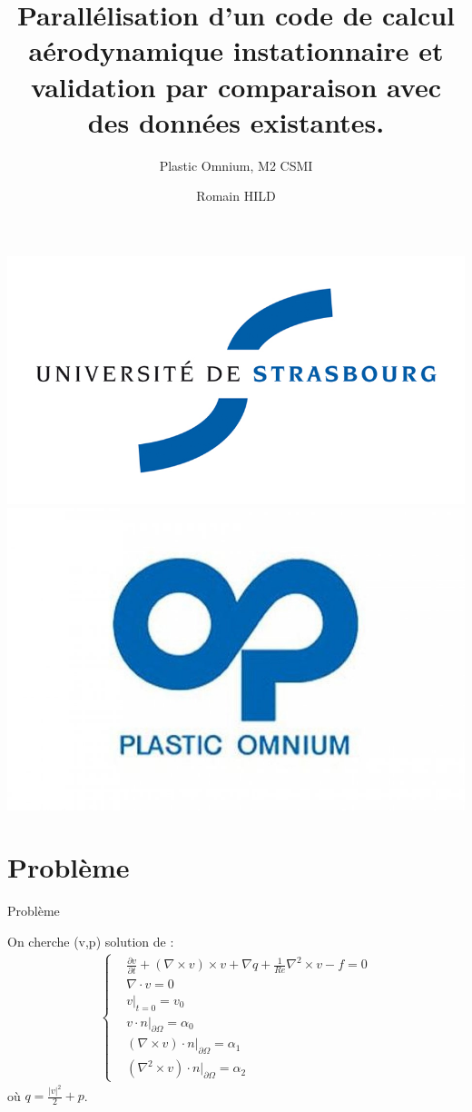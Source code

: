 \documentclass{beamer}
\title[Stage]{Parallélisation d'un code de calcul aérodynamique instationnaire et validation par comparaison avec des données existantes.}
\subtitle{Plastic Omnium, M2 CSMI}
\author{Romain HILD}
\institute{Université de Strasbourg}
\newcommand{\grad}{{\nabla}}
\newcommand{\rot}{{\nabla\times}}
\newcommand{\rott}{{\nabla^2\times}}
\newcommand{\diverg}{{\nabla\cdot}}
\newcommand{\restr}{{\big\rvert_{\partial\Omega}}}
\begin{document}
\begin{frame}
\includegraphics[scale=0.2]{uds.jpg}\includegraphics[scale=0.15]{po.jpg}
\titlepage
\end{frame}

\section{Problème}
\begin{frame}{Problème}
\begin{block}{On cherche (v,p) solution de :}
\begin{eqnarray}
\label{depart}
\left\{
\begin{aligned}
&\frac{\partial v}{\partial t} + (\rot  v)\times v + \grad q + \frac{1}{Re}\rott  v-f = 0\\
&\diverg v = 0\\
&v\big\rvert_{t=0} = v_0\\
&v\cdot n\restr = \alpha_0\\
&(\rot  v)\cdot n\restr = \alpha_1\\
&(\rott  v)\cdot n\restr = \alpha_2
\end{aligned}
\right.
\end{eqnarray}
où $q = \frac{|v|^2}{2}+p$.
\end{block}
\end{frame}
\end{document}
